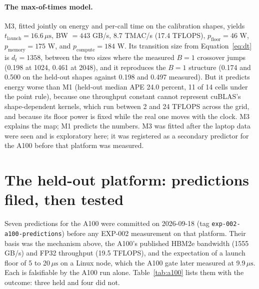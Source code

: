 \documentclass{article}
\newcommand{\us}{\,\mu\mathrm{s}}
\begin{document}
\paragraph{The max-of-times model.} M3, fitted jointly on energy and per-call time on the calibration shapes, yields $t_{\mathrm{launch}} = 16.6\us$, BW $= 443$ GB/s, 8.7 TMAC/s (17.4 TFLOPS), $p_{\mathrm{floor}} = 46$ W, $p_{\mathrm{memory}} = 175$ W, and $p_{\mathrm{compute}} = 184$ W. Its transition size from Equation~\ref{eq:dt} is $d_t = 1358$, between the two sizes where the measured $B = 1$ crossover jumps (0.198 at 1024, 0.461 at 2048), and it reproduces the $B = 1$ structure (0.174 and 0.500 on the held-out shapes against 0.198 and 0.497 measured). But it predicts energy worse than M1 (held-out median APE 24.0 percent, 11 of 14 cells under the point rule), because one throughput constant cannot represent cuBLAS's shape-dependent kernels, which run between 2 and 24 TFLOPS across the grid, and because its floor power is fixed while the real one moves with the clock. M3 explains the map; M1 predicts the numbers. M3 was fitted after the laptop data were seen and is exploratory here; it was registered as a secondary predictor for the A100 before that platform was measured.

\section{The held-out platform: predictions filed, then tested}
\label{sec:a100}

Seven predictions for the A100 were committed on 2026-09-18 (tag \texttt{exp-002-a100-predictions}) before any EXP-002 measurement on that platform. Their basis was the mechanism above, the A100's published HBM2e bandwidth (1555 GB/s) and FP32 throughput (19.5 TFLOPS), and the expectation of a launch floor of 5 to 20$\us$ on a Linux node, which the A100 gate later measured at 9.9$\us$. Each is falsifiable by the A100 run alone. Table~\ref{tab:a100} lists them with the outcome: three held and four did not.
\end{document}
